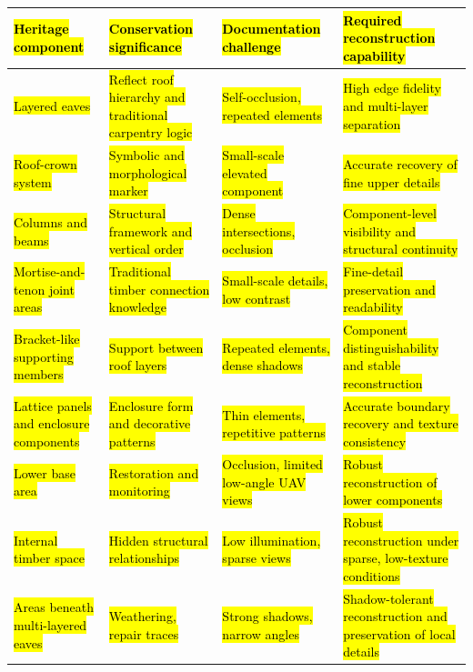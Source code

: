 \begin{longtable}[]{@{}
  >{\centering\arraybackslash}p{}
  >{\centering\arraybackslash}p{}
  >{\centering\arraybackslash}p{}
  >{\centering\arraybackslash}p{}@{}}
\toprule\noalign{}
\begin{minipage}[b]{\linewidth}\centering
\textbf{\hl{Heritage component}}
\end{minipage} & \begin{minipage}[b]{\linewidth}\centering
\textbf{\hl{Conservation significance}}
\end{minipage} & \begin{minipage}[b]{\linewidth}\centering
\textbf{\hl{Documentation challenge}}
\end{minipage} & \begin{minipage}[b]{\linewidth}\centering
\textbf{\hl{Required reconstruction capability}}
\end{minipage} \\
\midrule\noalign{}
\endhead
\bottomrule\noalign{}
\endlastfoot
\hl{Layered eaves} & \hl{Reflect roof hierarchy and traditional
carpentry logic} & \hl{Self-occlusion, repeated elements} & \hl{High
edge fidelity and multi-layer separation} \\
\hl{Roof-crown system} & \hl{Symbolic and morphological marker} &
\hl{Small-scale elevated component} & \hl{Accurate recovery of fine
upper details} \\
\hl{Columns and beams} & \hl{Structural framework and vertical order} &
\hl{Dense intersections, occlusion} & \hl{Component-level visibility and
structural continuity} \\
\hl{Mortise-and-tenon joint areas} & \hl{Traditional timber connection
knowledge} & \hl{Small-scale details, low contrast} & \hl{Fine-detail
preservation and readability} \\
\hl{Bracket-like supporting members} & \hl{Support between roof layers}
& \hl{Repeated elements, dense shadows} & \hl{Component
distinguishability and stable reconstruction} \\
\hl{Lattice panels and enclosure components} & \hl{Enclosure form and
decorative patterns} & \hl{Thin elements, repetitive patterns} &
\hl{Accurate boundary recovery and texture consistency} \\
\hl{Lower base area} & \hl{Restoration and monitoring} & \hl{Occlusion,
limited low-angle UAV views} & \hl{Robust reconstruction of lower
components} \\
\hl{Internal timber space} & \hl{Hidden structural relationships} &
\hl{Low illumination, sparse views} & \hl{Robust reconstruction under
sparse, low-texture conditions} \\
\hl{Areas beneath multi-layered eaves} & \hl{Weathering, repair traces}
& \hl{Strong shadows, narrow angles} & \hl{Shadow-tolerant
reconstruction and preservation of local details} \\
\end{longtable}

